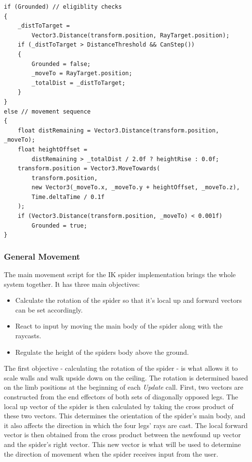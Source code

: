 \begin{lstlisting}[basicstyle=\linespread{0.9}\footnotesize\ttfamily, numbers=none,frame=single,
caption={The script's \textit{Update} method which contains eligibility checks
and execution logic for the leg target's movement sequence.
\textit{TargetLogic.cs}},captionpos=t, label=target_move, language={[Sharp]c},
float=tp]
if (Grounded) // eligiblity checks
{
    _distToTarget = 
        Vector3.Distance(transform.position, RayTarget.position);
    if (_distToTarget > DistanceThreshold && CanStep())
    {
        Grounded = false;
        _moveTo = RayTarget.position;
        _totalDist = _distToTarget;
    }
}
else // movement sequence
{
    float distRemaining = Vector3.Distance(transform.position, _moveTo);
    float heightOffset =
        distRemaining > _totalDist / 2.0f ? heightRise : 0.0f;
    transform.position = Vector3.MoveTowards(
        transform.position,
        new Vector3(_moveTo.x, _moveTo.y + heightOffset, _moveTo.z),
        Time.deltaTime / 0.1f
    );
    if (Vector3.Distance(transform.position, _moveTo) < 0.001f)
        Grounded = true;
}
\end{lstlisting}

\subsubsection{General Movement}
The main movement script for the IK spider implementation brings the whole
system together. It has three main objectives:

\begin{itemize}

    \item Calculate the rotation of the spider so that it's local up and forward
        vectors can be set accordingly.

    \item React to input by moving the main body of the spider along with the
        raycasts.

    \item Regulate the height of the spiders body above the ground.

\end{itemize}

The first objective - calculating the rotation of the spider - is what allows it
to scale walls and walk upside down on the ceiling. The rotation is determined
based on the limb positions at the beginning of each \textit{Update} call.
First, two vectors are constructed from the end effectors of both sets of
diagonally opposed legs. The local up vector of the spider is then calculated by
taking the cross product of these two vectors. This determines the orientation
of the spider's main body, and it also affects the direction in which the four legs'
rays are cast. The local forward vector is then obtained from the cross product
between the newfound up vector and the spider's right vector. This new vector is
what will be used to determine the direction of movement when the spider
receives input from the user.


